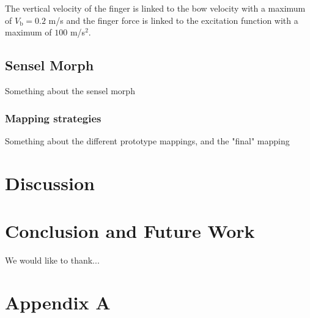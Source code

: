 \documentclass{article}
\begin{document}
The vertical velocity of the finger is linked to the bow velocity with a maximum of $V_\text{b} = 0.2$ m/s and the finger force is linked to the excitation function with a maximum of $100$ m/s$^2$.

\subsection{Sensel Morph}
Something about the sensel morph
\subsubsection{Mapping strategies}
Something about the different prototype mappings, and the "final" mapping 

\section{Discussion}\label{sec:discussion}


\section{Conclusion and Future Work}\label{sec:conclusion}

\begin{acknowledgments}
We would like to thank...
\end{acknowledgments} 



\section{Appendix A}
\end{document}
